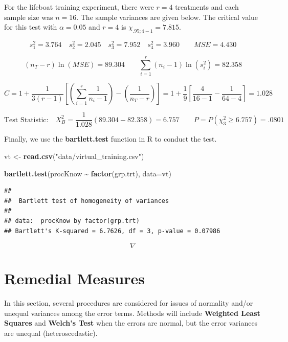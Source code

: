 \documentclass[
]{book}
\newenvironment{Shaded}{\begin{snugshade}}{\end{snugshade}}
\newcommand{\AttributeTok}[1]{\textcolor[rgb]{0.13,0.29,0.53}{#1}}
\newcommand{\FunctionTok}[1]{\textcolor[rgb]{0.13,0.29,0.53}{\textbf{#1}}}
\newcommand{\NormalTok}[1]{#1}
\newcommand{\OtherTok}[1]{\textcolor[rgb]{0.56,0.35,0.01}{#1}}
\newcommand{\SpecialCharTok}[1]{\textcolor[rgb]{0.81,0.36,0.00}{\textbf{#1}}}
\newcommand{\StringTok}[1]{\textcolor[rgb]{0.31,0.60,0.02}{#1}}
\begin{document}
For the lifeboat training experiment, there were \(r=4\) treatments and
each sample size was \(n=16\). The sample variances are given below. The
critical value for this test with \(\alpha=0.05\) and \(r=4\) is
\(\chi_{.95;4-1}=7.815\).

\[
s_1^2=3.764 \quad s_2^2=2.045 \quad s_3^2=7.952 \quad s_4^2=3.960
\qquad MSE=4.430
\]

\[
\left(n_T-r\right)\ln(MSE) = 89.304 \qquad
\sum_{i=1}^r\left(n_i-1\right)\ln\left(s_i^2\right)=82.358
\]

\[
C=1+\frac{1}{3(r-1)}\left[\left(\sum_{i=1}^r\frac{1}{n_i-1}\right)-\left(\frac{1}{n_T-r}\right)\right]=1+\frac{1}{9}\left[\frac{4}{16-1}-\frac{1}{64-4}\right]=1.028
\]

\[
\mbox{Test Statistic:} \quad X_B^2 = \frac{1}{1.028}(89.304-82.358)=6.757 \qquad
P=P\left(\chi_3^2 \ge 6.757\right)=.0801
\]

Finally, we use the \textbf{bartlett.test} function in R to conduct the
test.

\begin{Shaded}
\begin{Highlighting}[]
\NormalTok{vt }\OtherTok{\textless{}{-}} \FunctionTok{read.csv}\NormalTok{(}\StringTok{"data/virtual\_training.csv"}\NormalTok{)}

\FunctionTok{bartlett.test}\NormalTok{(procKnow }\SpecialCharTok{\textasciitilde{}} \FunctionTok{factor}\NormalTok{(grp.trt), }\AttributeTok{data=}\NormalTok{vt)}
\end{Highlighting}
\end{Shaded}

\begin{verbatim}
## 
##  Bartlett test of homogeneity of variances
## 
## data:  procKnow by factor(grp.trt)
## Bartlett's K-squared = 6.7626, df = 3, p-value = 0.07986
\end{verbatim}

\[
\nabla
\]

\section{Remedial Measures}\label{remedial-measures}

In this section, several procedures are considered for issues of
normality and/or unequal variances among the error terms. Methods will
include \textbf{Weighted Least Squares} and \textbf{Welch's Test} when
the errors are normal, but the error variances are unequal
(heteroscedastic).
\end{document}
